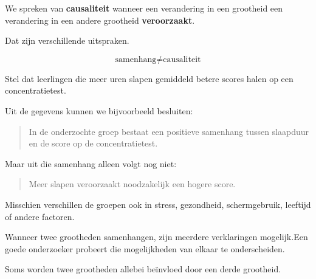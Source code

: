 \documentclass{ximera}
\begin{document}
\begin{definitie}
We spreken van \textbf{causaliteit} wanneer een verandering in een
grootheid een verandering in een andere grootheid
\textbf{veroorzaakt}.
\end{definitie}

Dat zijn verschillende uitspraken.

\[
\boxed{
\text{samenhang}
\neq
\text{causaliteit}
}
\]

\begin{voorbeeld}
Stel dat leerlingen die meer uren slapen gemiddeld betere scores halen
op een concentratietest.

Uit de gegevens kunnen we bijvoorbeeld besluiten:

\begin{quote}
In de onderzochte groep bestaat een positieve samenhang tussen
slaapduur en de score op de concentratietest.
\end{quote}

Maar uit die samenhang alleen volgt nog niet:

\begin{quote}
Meer slapen veroorzaakt noodzakelijk een hogere score.
\end{quote}

Misschien verschillen de groepen ook in stress, gezondheid,
schermgebruik, leeftijd of andere factoren.
\end{voorbeeld}



Wanneer twee grootheden samenhangen, zijn meerdere verklaringen
mogelijk.Een goede onderzoeker probeert die mogelijkheden van elkaar te
onderscheiden.



Soms worden twee grootheden allebei beïnvloed door een derde grootheid.
\end{document}
